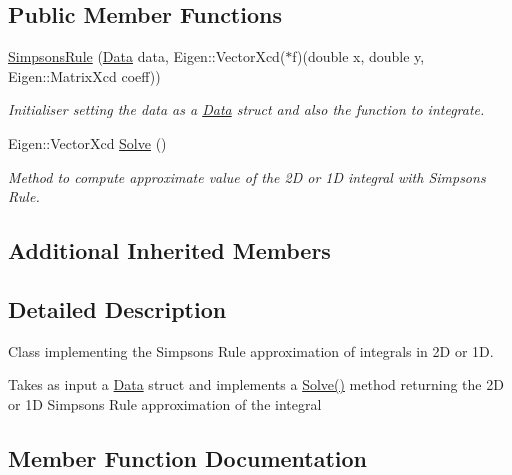 \subsection*{Public Member Functions}
\begin{DoxyCompactItemize}
\item 
\mbox{\label{class_simpsons_rule_af880433d19d6041cdedb081b542a195b}} 
\hyperlink{class_simpsons_rule_af880433d19d6041cdedb081b542a195b}{Simpsons\+Rule} (\hyperlink{struct_data}{Data} data, Eigen\+::\+Vector\+Xcd($\ast$f)(double x, double y, Eigen\+::\+Matrix\+Xcd coeff))
\begin{DoxyCompactList}\small\item\em Initialiser setting the data as a \hyperlink{struct_data}{Data} struct and also the function to integrate. \end{DoxyCompactList}\item 
Eigen\+::\+Vector\+Xcd \hyperlink{class_simpsons_rule_a9925b07e44be9fc1644d3cbeb742078c}{Solve} ()
\begin{DoxyCompactList}\small\item\em Method to compute approximate value of the 2D or 1D integral with Simpson\textquotesingle{}s Rule. \end{DoxyCompactList}\end{DoxyCompactItemize}
\subsection*{Additional Inherited Members}


\subsection{Detailed Description}
Class implementing the Simpson\textquotesingle{}s Rule approximation of integrals in 2D or 1D. 

Takes as input a \hyperlink{struct_data}{Data} struct and implements a \hyperlink{class_simpsons_rule_a9925b07e44be9fc1644d3cbeb742078c}{Solve()} method returning the 2D or 1D Simpson\textquotesingle{}s Rule approximation of the integral 

\subsection{Member Function Documentation}
\mbox{\label{class_simpsons_rule_a9925b07e44be9fc1644d3cbeb742078c}} 
